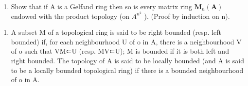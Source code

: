 \begin{enumerate}
\def\labelenumi{\alph{enumi})}
\setcounter{enumi}{1}
\tightlist
\item
  Show that if A is a Gelfand ring then so is every matrix ring \(\mathbf{M}_{n}(\mathbf{A})\) endowed with the product topology (on \(A^{n^{2}}\) ). (Proof by induction on n).
\end{enumerate}

\begin{enumerate}
\def\labelenumi{\arabic{enumi})}
\setcounter{enumi}{11}
\tightlist
\item
  A subset M of a topological ring is said to be right bounded (resp. left bounded) if, for each neighbourhood U of o in A, there is a neighbourhood V of o such that VM⊂U (resp. MV⊂U); M is bounded if it is both left and right bounded. The topology of A is said to be locally bounded (and A is said to be a locally bounded topological ring) if there is a bounded neighbourhood of o in A.
\end{enumerate}

